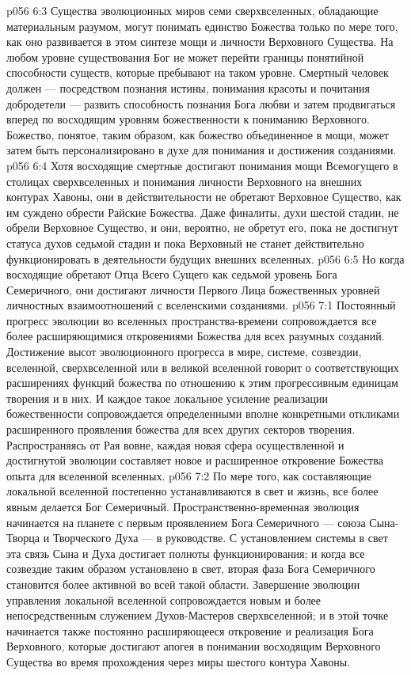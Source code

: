 \vs p056 6:3 \pc Существа эволюционных миров семи сверхвселенных, обладающие материальным разумом, могут понимать единство Божества только по мере того, как оно развивается в этом синтезе мощи и личности Верховного Существа. На любом уровне существования Бог не может перейти границы понятийной способности существ, которые пребывают на таком уровне. Смертный человек должен --- посредством познания истины, понимания красоты и почитания добродетели --- развить способность познания Бога любви и затем продвигаться вперед по восходящим уровням божественности к пониманию Верховного. Божество, понятое, таким образом, как божество объединенное в мощи, может затем быть персонализировано в духе для понимания и достижения созданиями.
\vs p056 6:4 Хотя восходящие смертные достигают понимания мощи Всемогущего в столицах сверхвселенных и понимания личности Верховного на внешних контурах Хавоны, они в действительности не обретают Верховное Существо, как им суждено обрести Райские Божества. Даже финалиты, духи шестой стадии, не обрели Верховное Существо, и они, вероятно, не обретут его, пока не достигнут статуса духов седьмой стадии и пока Верховный не станет действительно функционировать в деятельности будущих внешних вселенных.
\vs p056 6:5 Но когда восходящие обретают Отца Всего Сущего как седьмой уровень Бога Семеричного, они достигают личности Первого Лица  божественных уровней личностных взаимоотношений с вселенскими созданиями.
\vs p056 7:1 Постоянный прогресс эволюции во вселенных пространства\hyp{}времени сопровождается все более расширяющимися откровениями Божества для всех разумных созданий. Достижение высот эволюционного прогресса в мире, системе, созвездии, вселенной, сверхвселенной или в великой вселенной говорит о соответствующих расширениях функций божества по отношению к этим прогрессивным единицам творения и в них. И каждое такое локальное усиление реализации божественности сопровождается определенными вполне конкретными откликами расширенного проявления божества для всех других секторов творения. Распространяясь от Рая вовне, каждая новая сфера осуществленной и достигнутой эволюции составляет новое и расширенное откровение Божества опыта для вселенной вселенных.
\vs p056 7:2 По мере того, как составляющие локальной вселенной постепенно устанавливаются в свет и жизнь, все более явным делается Бог Семеричный. Пространственно\hyp{}временная эволюция начинается на планете с первым проявлением Бога Семеричного --- союза Сына\hyp{}Творца и Творческого Духа --- в руководстве. С установлением системы в свет эта связь Сына и Духа достигает полноты функционирования; и когда все созвездие таким образом установлено в свет, вторая фаза Бога Семеричного становится более активной во всей такой области. Завершение эволюции управления локальной вселенной сопровождается новым и более непосредственным служением Духов\hyp{}Мастеров сверхвселенной; и в этой точке начинается также постоянно расширяющееся откровение и реализация Бога Верховного, которые достигают апогея в понимании восходящим Верховного Существа во время прохождения через миры шестого контура Хавоны.
